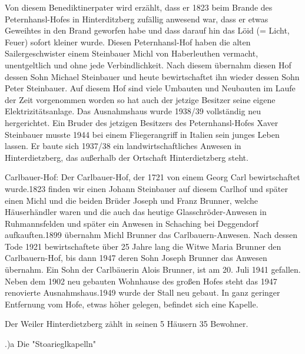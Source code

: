 Von diesem Benediktinerpater wird erzählt, dass er 1823 beim Brande des
Peternhansl-Hofes in Hinterditzberg zufällig anwesend war, dass er etwas
Geweihtes in den Brand geworfen habe und dass darauf hin das Löid (= Licht,
Feuer) sofort kleiner wurde. Diesen Peternhansl-Hof haben die alten
Sailergeschwister einem Steinbauer Michl von Haberleuthen vermacht,
unentgeltlich und ohne jede Verbindlichkeit. Nach diesem übernahm diesen Hof
dessen Sohn Michael Steinbauer und heute bewirtschaftet ihn wieder dessen Sohn
Peter Steinbauer. Auf diesem Hof sind viele Umbauten und Neubauten im Laufe der
Zeit vorgenommen worden so hat auch der jetzige Besitzer seine eigene
Elektrizitätsanlage. Das Ausnahmshaus wurde 1938/39 vollständig neu
hergerichtet. Ein Bruder des jetzigen Besitzers des Peternhansl-Hofes Xaver
Steinbauer musste 1944 bei einem Fliegerangriff in Italien sein junges Leben
lassen. Er baute sich 1937/38 ein landwirtschaftliches Anwesen in
Hinterdietzberg, das außerhalb der Ortschaft Hinterdietzberg steht.

Carlbauer-Hof: Der Carlbauer-Hof, der 1721 von einem Georg Carl bewirtschaftet
wurde.1823 finden wir einen Johann Steinbauer auf diesem Carlhof und später
einen Michl und die beiden Brüder Joseph und Franz Brunner, welche Häuserhändler
waren und die auch das heutige Glasschröder-Anwesen in Ruhmannsfelden und später
ein Anwesen in Schaching bei Deggendorf aufkauften.1899 übernahm Michl Brunner
das Carlbauern-Anwesen. Nach dessen Tode 1921 bewirtschaftete über 25 Jahre lang
die Witwe Maria Brunner den Carlbauern-Hof, bis dann 1947 deren Sohn Joseph
Brunner das Anwesen übernahm. Ein Sohn der Carlbäuerin Alois Brunner, ist am 20.
Juli 1941 gefallen. Neben dem 1902 neu gebauten Wohnhause des großen Hofes steht
das 1947 renovierte Ausnahmshaus.1949 wurde der Stall neu gebaut. In ganz
geringer Entfernung vom Hofe, etwas höher gelegen, befindet sich eine Kapelle.

Der Weiler Hinterdietzberg zählt in seinen 5 Häusern 35 Bewohner.

.)a Die "Stoarieglkapelln"

